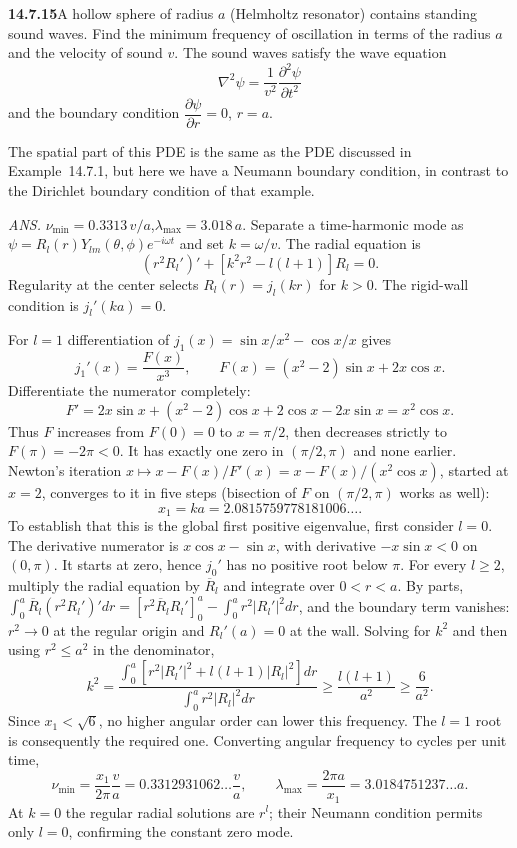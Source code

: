\par\bigskip
\noindent\textbf{14.7.15}\quad A hollow sphere of radius $a$ (Helmholtz
resonator) contains standing sound waves. Find the minimum  frequency
of oscillation in terms of the radius $a$ and the velocity of sound
$v$. The sound waves satisfy the wave equation
\[
\nabla^{2}\psi=\frac{1}{v^{2}}\frac{\partial^{2}\psi}{\partial t^{2}}
\]
and the boundary condition $\dfrac{\partial\psi}{\partial r}=0$,
$r=a$.
\par The spatial part of this PDE is the same as the PDE discussed in
Example~14.7.1, but here we have a Neumann boundary condition, in
contrast to the Dirichlet boundary condition of that example.
\par\nobreak\hfill\emph{ANS.}\enspace
$\nu_{\min}=0.3313\,v/a$,\quad$\lambda_{\max}=3.018\,a$.
\solution
Separate a time-harmonic mode as
$\psi=R_l(r)Y_{lm}(\theta,\phi)e^{-i\omega t}$ and set
$k=\omega/v$. The radial equation is
\[
(r^2R_l')'+[k^2r^2-l(l+1)]R_l=0.
\]
Regularity at the center selects $R_l(r)=j_l(kr)$ for $k>0$.
The rigid-wall condition is $j_l'(ka)=0$.

For $l=1$ differentiation of
$j_1(x)=\sin x/x^2-\cos x/x$ gives
\[
j_1'(x)=\frac{F(x)}{x^3},\qquad
F(x)=(x^2-2)\sin x+2x\cos x.
\]
Differentiate the numerator completely:
\[
F'=2x\sin x+(x^2-2)\cos x+2\cos x-2x\sin x=x^2\cos x.
\]
Thus $F$ increases from $F(0)=0$ to $x=\pi/2$, then decreases
strictly to $F(\pi)=-2\pi<0$. It has exactly one zero in
$(\pi/2,\pi)$ and none earlier. Newton's iteration
$x\mapsto x-F(x)/F'(x)=x-F(x)/(x^2\cos x)$, started at $x=2$,
converges to it in five steps (bisection of $F$ on $(\pi/2,\pi)$
works as well):
\[
x_1=ka=2.0815759778181006\ldots.
\]
To establish that this is the global first positive eigenvalue,
first consider $l=0$. The derivative numerator is
$x\cos x-\sin x$, with derivative $-x\sin x<0$ on $(0,\pi)$.
It starts at zero, hence $j_0'$ has no positive root below $\pi$.
For every $l\ge2$, multiply the radial equation by $\overline R_l$
and integrate over $0<r<a$. By parts,
$\int_0^a\overline R_l(r^2R_l')'dr
=[r^2\overline R_lR_l']_0^a-\int_0^ar^2|R_l'|^2dr$, and the
boundary term vanishes: $r^2\to0$ at the regular origin and
$R_l'(a)=0$ at the wall. Solving for $k^2$ and then using
$r^2\le a^2$ in the denominator,
\[
k^2=\frac{\int_0^a[r^2|R_l'|^2+l(l+1)|R_l|^2]dr}
{\int_0^a r^2|R_l|^2dr}
\ge\frac{l(l+1)}{a^2}\ge\frac6{a^2}.
\]
Since $x_1<\sqrt6$, no higher angular order can lower this
frequency. The $l=1$ root is consequently the required one.
Converting angular frequency to cycles per unit time,
\[
\boxed{\nu_{\min}=\frac{x_1}{2\pi}\frac va
=0.3312931062\ldots\frac va,\qquad
\lambda_{\max}=\frac{2\pi a}{x_1}
=3.0184751237\ldots a.}
\]
At $k=0$ the regular radial solutions are $r^l$; their Neumann
condition permits only $l=0$, confirming the constant zero mode.

